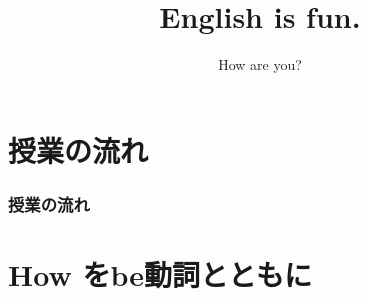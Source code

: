 \documentclass[aspectratio=169,xcolor={dvipsnames,table}]{beamer}
\title{English is fun.}
\subtitle{How are you?}
\author{}
\institute[]{}
\date[]
\begin{document}
\begin{frame}[plain]
  \titlepage
\end{frame}
\begin{frame}[plain]
\hyperlink{today}{}%
\end{frame}
\section*{授業の流れ}
\begin{frame}[plain]
  \frametitle{授業の流れ}
  \tableofcontents
\end{frame}

\section{How をbe動詞とともに}
\end{document}
